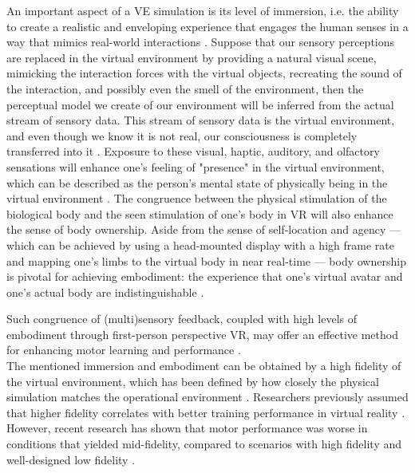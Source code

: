 \documentclass[conference]{IEEEtran}
\begin{document}
An important aspect of a VE simulation is its level of immersion, i.e. the ability to create a realistic and enveloping experience that engages the human senses in a way that mimics real-world interactions \cite{Sanchez-Vives2005FromReality}. Suppose that our sensory perceptions are replaced in the virtual environment by providing a natural visual scene, mimicking the interaction forces with the virtual objects, recreating the sound of the interaction, and possibly even the smell of the environment, then the perceptual model we create of our environment will be inferred from the actual stream of sensory data. This stream of sensory data is the virtual environment, and even though we know it is not real, our consciousness is completely transferred into it \cite{Slater2016EnhancingReality}. 
Exposure to these visual, haptic, auditory, and olfactory sensations will enhance one's feeling of "presence" in the virtual environment, which can be described as the person's mental state of physically being in the virtual environment \cite{Draper1998Telepresence, Sanchez-Vives2005FromReality, Dzardanova2024ExploringReality}. The congruence between the physical stimulation of the biological body and the seen stimulation of one's body in VR will also enhance the sense of body ownership. Aside from the sense of self-location and agency --- which can be achieved by using a head-mounted display with a high frame rate and mapping one's limbs to the virtual body in near real-time --- body ownership is pivotal for achieving embodiment:  the experience that one's virtual avatar and one's actual body are indistinguishable \cite{Kilteni2012TheReality}.

Such congruence of (multi)sensory feedback, coupled with high levels of embodiment through first-person perspective VR, may offer an effective method for enhancing motor learning and performance \cite{Odermatt2021CongruencyReality}. \\

The mentioned immersion and embodiment can be obtained by a high fidelity of the virtual environment, which has been defined by how closely the physical simulation matches the operational environment \cite{Caird1996PersistentTraining}.
Researchers previously assumed that higher fidelity correlates with better training performance in virtual reality \cite{Caird1996PersistentTraining, Waller1998TheTraining}. However, recent research has shown that motor performance was worse in conditions that yielded mid-fidelity, compared to scenarios with high fidelity and well-designed low fidelity \cite{MahdiNabiyouni201520153DUI.}. 
\end{document}
